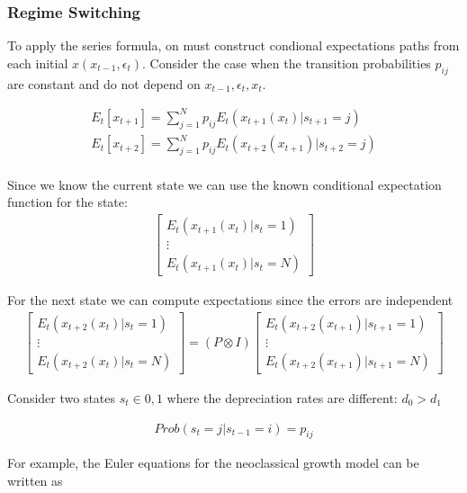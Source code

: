 \documentclass[12pt]{article}
\begin{document}
\subsubsection{Regime Switching}


\label{sec:regime-switch-model}

To apply the series formula, on must construct condional expectations paths from each initial $x(x_{t-1},\epsilon_t)$.  Consider the case when the transition 
probabilities $p_{ij}$ are constant and do not depend on 
$x_{t-1},\epsilon_t,x_t$.

\begin{gather*}
E_t[x_{t+1}]=  \sum_{j=1}^{N} p_{ij} E_t(x_{t+1}(x_t)|s_{t+1}=j)  \\
E_t[x_{t+2}]=  \sum_{j=1}^{N} p_{ij} E_t(x_{t+2}(x_{t+1})|s_{t+2}=j)  \\
\end{gather*}

Since we know the current state we can use the known conditional expectation function for the state:
\begin{gather*}
    \begin{bmatrix}
E_t(x_{t+1}(x_{t})|s_{t}=1)  \\    \vdots \\
E_t(x_{t+1}(x_{t})|s_{t}=N)  
  \end{bmatrix}
\end{gather*}

For the next state we can compute expectations since the errors are independent
\begin{gather*}
  \begin{bmatrix}
E_t(x_{t+2}(x_t)|s_{t}=1)  \\    \vdots \\
E_t(x_{t+2}(x_t)|s_{t}=N)  
  \end{bmatrix}=
(P \otimes  I)
  \begin{bmatrix}
E_t(x_{t+2}(x_{t+1})|s_{t+1}=1)  \\    \vdots \\
E_t(x_{t+2}(x_{t+1})|s_{t+1}=N)  
  \end{bmatrix}
\end{gather*}

Consider two states $s_t \in {0,1}$ where the depreciation rates are different:  $d_0>d_1$

\begin{gather}
    Prob(s_t=j|s_{t-1}=i)=p_{ij}
\end{gather}

For example, the Euler equations for the  neoclassical growth  model 
can be written as
 
\end{document}
